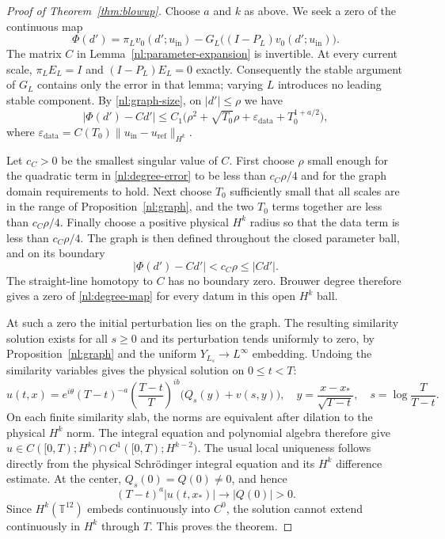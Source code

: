\documentclass[11pt]{article}
\numberwithin{equation}{section}
\theoremstyle{definition}
\theoremstyle{remark}
\begin{document}
\begin{proof}[Proof of Theorem~\ref{thm:blowup}]
Choose $a$ and $k$ as above. We seek a zero of the continuous map
\begin{equation}\label{nl:degree-map}
 \Phi(d')=\pi_Lv_0(d';u_{\mathrm{in}})
       -G_L\bigl((I-P_L)v_0(d';u_{\mathrm{in}})\bigr).
\end{equation}
The matrix $C$ in Lemma~\ref{nl:parameter-expansion} is invertible.
At every current scale, $\pi_LE_L=I$ and $(I-P_L)E_L=0$ exactly.
Consequently the stable argument of $G_L$ contains only the error in
that lemma; varying $L$ introduces no leading stable component.
By \eqref{nl:graph-size}, on $|d'|\leq\rho$ we have
\begin{equation}\label{nl:degree-error}
 |\Phi(d')-Cd'|
 \leq C_1\bigl(\rho^2+\sqrt{T_0}\rho
                   +\varepsilon_{\mathrm{data}}+T_0^{1+a/2}\bigr),
\end{equation}
where
$\varepsilon_{\mathrm{data}}=C(T_0)
\|u_{\mathrm{in}}-u_{\mathrm{ref}}\|_{H^k}$.

Let $c_C>0$ be the smallest singular value of $C$.
First choose $\rho$ small enough for the quadratic term in
\eqref{nl:degree-error} to be less than $c_C\rho/4$ and for the graph
domain requirements to hold. Next choose $T_0$ sufficiently small that
all scales are in the range of Proposition~\ref{nl:graph}, and the two
$T_0$ terms together are less than $c_C\rho/4$.
Finally choose a positive physical $H^k$ radius so that the data term
is less than $c_C\rho/4$. The graph is then defined throughout the
closed parameter ball, and on its boundary
\[
 |\Phi(d')-Cd'|<c_C\rho\leq |Cd'|.
\]
The straight-line homotopy to $C$ has no boundary zero. Brouwer degree
therefore gives a zero of \eqref{nl:degree-map} for every datum in this
open $H^k$ ball.

At such a zero the initial perturbation lies on the graph. The resulting
similarity solution exists for all $s\geq0$ and its perturbation tends
uniformly to zero, by Proposition~\ref{nl:graph} and the uniform
$Y_{L_s}\to L^\infty$ embedding. Undoing the similarity variables gives
the physical solution on $0\leq t<T$:
\[
 u(t,x)=e^{i\theta}(T-t)^{-a}
       \left(\frac{T-t}{T}\right)^{ib}
       \bigl(Q_s(y)+v(s,y)\bigr),
 \quad y=\frac{x-x_*}{\sqrt{T-t}},\quad
 s=\log\frac{T}{T-t}.
\]
On each finite similarity slab, the norms are equivalent after dilation
to the physical $H^k$ norm. The integral equation and polynomial algebra
therefore give $u\in C([0,T);H^k)\cap C^1([0,T);H^{k-2})$.
The usual local uniqueness follows directly from the physical
Schr\"odinger integral equation and its $H^k$ difference estimate.
At the center, $Q_s(0)=Q(0)\ne0$, and hence
\[
 (T-t)^a|u(t,x_*)|\longrightarrow |Q(0)|>0.
\]
Since $H^k(\mathbb T^{12})$ embeds continuously into $C^0$, the solution
cannot extend continuously in $H^k$ through $T$. This proves the theorem.
\end{proof}
\end{document}
